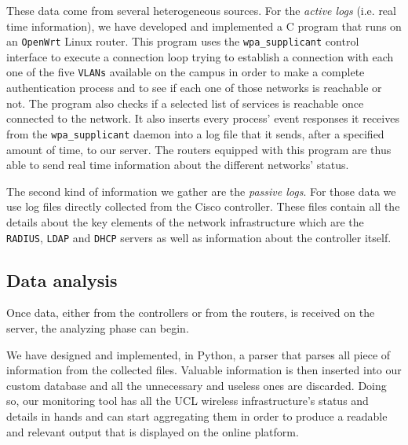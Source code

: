 These data come from several heterogeneous sources. For the \textit{active logs} (i.e. real time information), we have developed and implemented a C program that runs on an \texttt{OpenWrt} Linux router. This program uses the \texttt{wpa\_supplicant} control interface to execute a connection loop trying to establish a connection with each one of the five \texttt{VLANs} available on the campus in order to make a complete authentication process and to see if each one of those networks is reachable or not. The program also checks if a selected list of services is reachable once connected to the network. It also inserts every process' event responses it receives from the \texttt{wpa\_supplicant} daemon into a log file that it sends, after a specified amount of time, to our server. The routers equipped with this program are thus able to send real time information about the different networks' status.

The second kind of information we gather are the \textit{passive logs}. For those data we use log files directly collected from the Cisco controller. These files contain all the details about the key elements of the network infrastructure which are the \texttt{RADIUS}, \texttt{LDAP} and \texttt{DHCP} servers as well as information about the controller itself.


\subsection{Data analysis}
Once data, either from the controllers or from the routers, is received on the server, the analyzing phase can begin.

We have designed and implemented, in Python, a parser that parses all piece of information from the collected files. Valuable information is then inserted into our custom database and all the unnecessary and useless ones are discarded. Doing so, our monitoring tool has all the UCL wireless infrastructure's status and details in hands and can start aggregating them in order to produce a readable and relevant output that is displayed on the online platform.

